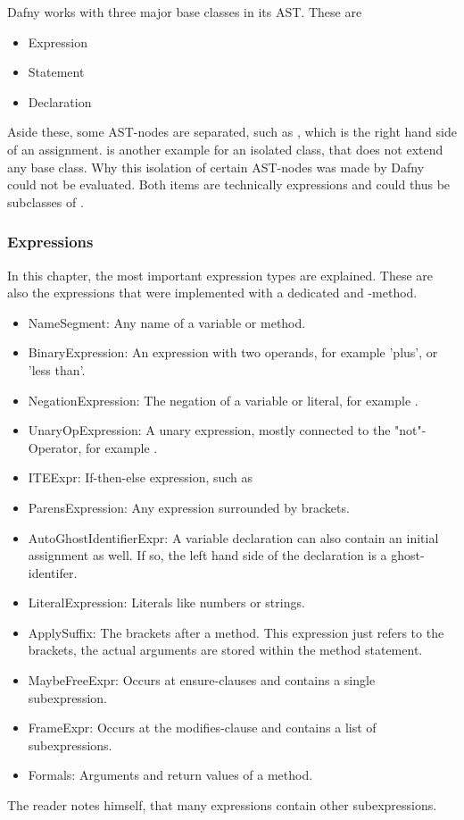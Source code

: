 Dafny works with three major base classes in its AST.
These are
\begin{itemize}
    \item Expression
    \item Statement
    \item Declaration
\end{itemize}
Aside these, some AST-nodes are separated, such as , which is the right hand side of an assignment.
 is another example for an isolated class, that does not extend any base class.
Why this isolation of certain AST-nodes was made by Dafny could not be evaluated.
Both items are technically expressions and could thus be subclasses of .

\subsubsection{Expressions}
In this chapter, the most important expression types are explained.
These are also the expressions that were implemented with a dedicated  and -method.
\begin{itemize}

    \item NameSegment: Any name of a variable or method.
    \item BinaryExpression: An expression with two operands, for example 'plus', or 'less than'.
    \item NegationExpression: The negation of a variable or literal, for example .
    \item UnaryOpExpression: A unary expression, mostly connected to the "not"-Operator, for example .
    \item ITEExpr: If-then-else expression, such as 
    \item ParensExpression: Any expression surrounded by brackets.
    \item AutoGhostIdentifierExpr: A variable declaration can also contain an initial assignment as well. If so, the left hand side of the declaration is a ghost-identifer.
    \item LiteralExpression: Literals like numbers or strings.
    \item ApplySuffix: The brackets after a method. This expression just refers to the brackets, the actual arguments are stored within the method statement.
    \item MaybeFreeExpr: Occurs at ensure-clauses and contains a single subexpression.
    \item FrameExpr: Occurs at the modifies-clause and contains a list of subexpressions.
    \item Formals: Arguments and return values of a method.
\end{itemize}
The reader notes himself, that many expressions contain other subexpressions.

